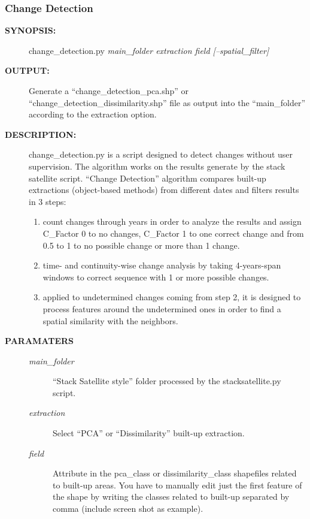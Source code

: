 \documentclass[letterpaper,10pt,english]{sphinxmanual}
\begin{document}
\subsubsection{Change Detection}
\label{user:change-detection}\begin{description}
\item[{\textbf{SYNOPSIS:}}] \leavevmode
change\_detection.py \emph{main\_folder extraction field {[}--spatial\_filter{]}}

\item[{\textbf{OUTPUT:}}] \leavevmode
Generate a ``change\_detection\_pca.shp'' or ``change\_detection\_dissimilarity.shp'' file as output into the ``main\_folder'' according to the extraction option.

\item[{\textbf{DESCRIPTION:}}] \leavevmode
change\_detection.py is a script designed to detect changes without user supervision. The algorithm works on the results generate by the stack satellite script.
``Change Detection'' algorithm compares built-up extractions (object-based methods) from different dates and filters results in 3 steps:
\begin{enumerate}
\item {} 
count changes through years in order to analyze the results and assign C\_Factor 0 to no changes, C\_Factor 1 to one correct change and from 0.5 to 1 to no possible change or more than 1 change.

\item {} 
time- and continuity-wise change analysis by taking 4-years-span windows to correct sequence with 1 or more possible changes.

\item {} 
applied to undetermined changes coming from step 2, it is designed to process features around the undetermined ones in order to find a spatial similarity with the neighbors.

\end{enumerate}

\item[{\textbf{PARAMATERS}}] \leavevmode\begin{description}
\item[{\emph{main\_folder}}] \leavevmode
``Stack Satellite style'' folder processed by the stacksatellite.py script.

\item[{\emph{extraction}}] \leavevmode
Select ``PCA'' or ``Dissimilarity'' built-up extraction.

\item[{\emph{field}}] \leavevmode
Attribute in the pca\_class or dissimilarity\_class shapefiles related to built-up areas. You have to manually edit just the first feature of the shape by writing the classes related to built-up separated by comma (include screen shot as example).

\end{description}

\end{description}
\end{document}
